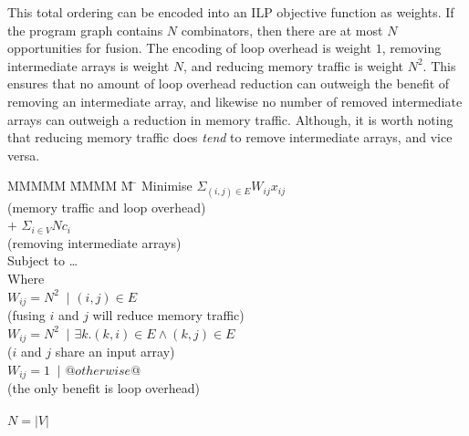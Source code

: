 This total ordering can be encoded into an ILP objective function as weights.
If the program graph contains $N$ combinators, then there are at most $N$ opportunities for fusion.
The encoding of loop overhead is weight $1$, removing intermediate arrays is weight $N$, and reducing memory traffic is weight $N^2$.
This ensures that no amount of loop overhead reduction can outweigh the benefit of removing an intermediate array,
and likewise no number of removed intermediate arrays can outweigh a reduction in memory traffic.
Although, it is worth noting that reducing memory traffic does \emph{tend} to remove intermediate arrays, and vice versa.

\begin{tabbing}
MMMMM   \= MMMM \= M \= \kill
Minimise   \>     \> $\Sigma_{(i,j) \in E} W_{ij} x_{ij}$   \\
           \> \> \> (memory traffic and loop overhead)         \\
           \> $+$ \> $\Sigma_{i \in V} N c_i$  \\
           \> \> \> (removing intermediate arrays)         \\
Subject to \> \ldots                                \\
Where      \>                                       \\
           \> $W_{ij} = N^2$ \> $~|$ \> $(i,j) \in E $         \\
           \> \> \> (fusing $i$ and $j$ will reduce memory traffic)         \\
           \> $W_{ij} = N^2$ \> $~|$ \> $\exists k. (k,i) \in E \wedge (k,j) \in E $     \\
           \> \> \> ($i$ and $j$ share an input array)                                         \\
           \> $W_{ij} = 1$   \> $~|$ \> $@otherwise@$                                                  \\
           \> \> \> (the only benefit is loop overhead)                                        \\
           \\
           \> $N = |V|$
\end{tabbing}



